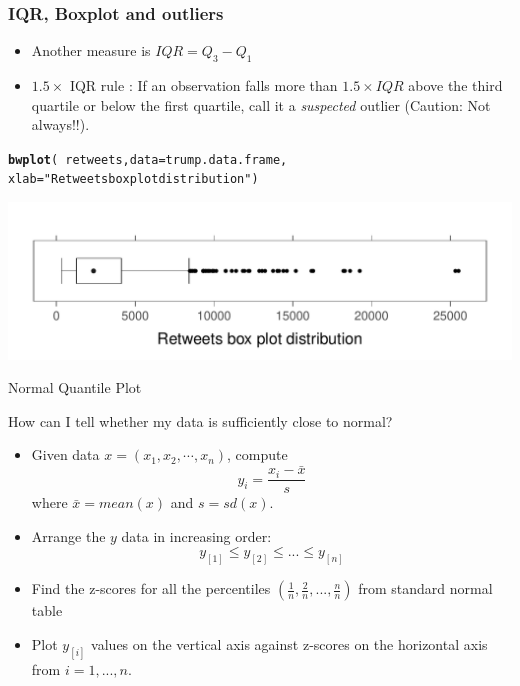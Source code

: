 \documentclass{beamer}\usepackage[]{graphicx}\usepackage[]{color}
\makeatletter
\newcommand{\hlstr}[1]{\textcolor[rgb]{0.2,0.2,0.2}{#1}}%
\newcommand{\hlopt}[1]{\textcolor[rgb]{0.102,0.102,0.102}{#1}}%
\newcommand{\hlstd}[1]{\textcolor[rgb]{0.102,0.102,0.102}{#1}}%
\newcommand{\hlkwc}[1]{\textcolor[rgb]{0.2,0.2,0.2}{#1}}%
\newcommand{\hlkwd}[1]{\textcolor[rgb]{0.102,0.102,0.102}{\textbf{#1}}}%
\newenvironment{kframe}{%
 \def\at@end@of@kframe{}%
 \ifinner\ifhmode%
  \def\at@end@of@kframe{\end{minipage}}%
  \begin{minipage}{\columnwidth}%
 \fi\fi%
 \def\FrameCommand##1{\hskip\@totalleftmargin \hskip-\fboxsep
 \colorbox{shadecolor}{##1}\hskip-\fboxsep
     \hskip-\linewidth \hskip-\@totalleftmargin \hskip\columnwidth}%
 \MakeFramed {\advance\hsize-\width
   \@totalleftmargin\z@ \linewidth\hsize
   \@setminipage}}%
 {\par\unskip\endMakeFramed%
 \at@end@of@kframe}
\newenvironment{knitrout}{}{} %
\renewenvironment{knitrout}{\begin{spacing}{0.75}\begin{tiny}}{\end{tiny}\end{spacing}}
\makeatother
\begin{document}
\begin{frame}

\frametitle{IQR, Boxplot and outliers}
\begin{itemize} 
\item Another measure is $IQR= Q_3-Q_1$ \pause
\item $1.5 \times$  IQR rule : If an observation falls more than $1.5  \times IQR $ above the third quartile or below the first quartile, call it a \emph{suspected} outlier (Caution: Not always!!). \pause 
\end{itemize}
\begin{knitrout}\small
{}\color{fgcolor}\begin{kframe}
\begin{alltt}
\hlkwd{bwplot}\hlstd{(}\hlopt{~} \hlstd{retweets,} \hlkwc{data}\hlstd{=trump.data.frame,}
       \hlkwc{xlab}\hlstd{=}\hlstr{"Retweets box plot distribution"}\hlstd{)}
\end{alltt}
\end{kframe}

{\centering \includegraphics[width=0.89\linewidth]{figure/graphics-bw_retweets_2-1} 

}



\end{knitrout}
\end{frame}

\begin{frame}{Normal Quantile Plot}

How can I tell whether my data is sufficiently close to normal?

\begin{itemize}
\item Given data $x=(x_1, x_2, \cdots, x_n)$, compute
$$ y_{i} = \frac{x_{i} - \bar{x}}{s} $$
where $\bar{x} = mean(x)$ and $s = sd(x)$.

\item Arrange the $y$ data in increasing order: 
$$ y_{[1]} \leq y_{[2]} \leq ... \leq y_{[n]} $$

\item Find the z-scores for all the percentiles $(\frac{1}{n}, \frac{2}{n}, ..., \frac{n}{n})$ from standard normal table

\item  Plot $y_{[i]}$ values on the vertical axis against z-scores on the horizontal axis from $i = 1, ..., n$.

\end{itemize}
\end{frame}
\end{document}
